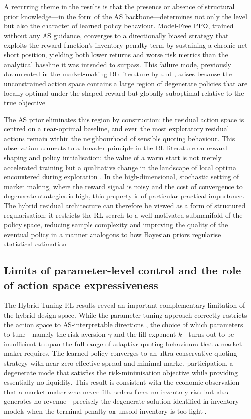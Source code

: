 \documentclass[11pt]{article}
\begin{document}
A recurring theme in the results is that the presence or absence of
structural prior knowledge---in the form of the AS backbone---determines
not only the level but also the character of learned policy behaviour.
Model-Free PPO, trained without any AS guidance, converges to a
directionally biased strategy that exploits the reward function's
inventory-penalty term by sustaining a chronic net short position,
yielding both lower returns and worse risk metrics than the analytical
baseline it was intended to surpass.
This failure mode, previously documented in the market-making RL
literature by \textcite{spooner2018mmrl} and \textcite{gasperov2021rlmm},
arises because the unconstrained action space contains a large region of
degenerate policies that are locally optimal under the shaped reward
but globally suboptimal relative to the true objective.

The AS prior eliminates this region by construction: the residual action
space is centred on a near-optimal baseline, and even the most
exploratory residual actions remain within the neighbourhood of sensible
quoting behaviour.
This observation connects to a broader principle in the RL literature
on reward shaping and policy initialisation: the value of a warm start
is not merely accelerated training but a qualitative change in the
landscape of local optima encountered during exploration
\parencite{falces2022asrl}.
In the high-dimensional, stochastic setting of market making, where the
reward signal is noisy and the cost of convergence to degenerate
strategies is high, this property is of particular practical importance.
The hybrid residual architecture can therefore be viewed as a form of
structured regularisation: it restricts the RL search to a well-motivated
submanifold of the policy space, reducing sample complexity and improving
the quality of the eventual policy in a manner analogous to how
Bayesian priors regularise statistical estimation.

\subsection{Limits of parameter-level control and the role of action space
  expressiveness}

The Hybrid Tuning RL results reveal an important complementary limitation
of the hybrid design space.
While the parameter-tuning approach correctly restricts the action space
to AS-interpretable directions \parencite{falces2022asrl}, the choice of
which parameters to tune---namely the risk aversion $\gamma$ and the
fill exponent $k$---turns out to be insufficient to span the full range
of adaptive quoting behaviours that a market maker requires.
The learned policy converges to an ultra-conservative quoting strategy
with near-zero effective spread and minimal market participation, a
degenerate mode that satisfies the risk-minimisation objective while
providing essentially no liquidity.
This result is consistent with the economic observation that a market
maker who never fills orders faces no inventory risk but also generates
no revenue---precisely the degenerate solution identified in inventory
models when the terminal penalty on unsold inventory is too light
\parencite{guilbaud2013optimal,stoikov2009option}.
\end{document}
